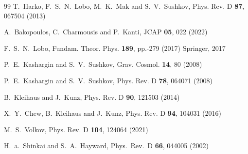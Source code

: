 \documentclass[floats,floatfix,showpacs,amssymb,prd,superscriptaddress,nofootinbib,nolongbibliography,reprint]{revtex4-2}
\begin{document}
\begin{thebibliography}{99}
T.~Harko, F.~S.~N.~Lobo, M.~K.~Mak and S.~V.~Sushkov,
Phys. Rev. D \textbf{87}, 067504 (2013)

A.~Bakopoulos, C.~Charmousis and P.~Kanti,
JCAP \textbf{05}, 022 (2022)


F.~S.~N.~Lobo,
Fundam. Theor. Phys. \textbf{189}, pp.-279 (2017)
Springer, 2017

P.~E.~Kashargin and S.~V.~Sushkov,
Grav. Cosmol. \textbf{14}, 80 (2008)

P.~E.~Kashargin and S.~V.~Sushkov,
Phys. Rev. D \textbf{78}, 064071 (2008)

B.~Kleihaus and J.~Kunz,
Phys. Rev. D \textbf{90}, 121503 (2014)

X.~Y.~Chew, B.~Kleihaus and J.~Kunz,
Phys. Rev. D \textbf{94}, 104031 (2016)

M.~S.~Volkov,
Phys. Rev. D \textbf{104}, 124064 (2021)

  H.~a.~Shinkai and S.~A.~Hayward,
  Phys.\ Rev.\ D {\bf 66}, 044005 (2002)


\end{thebibliography}
\end{document}
